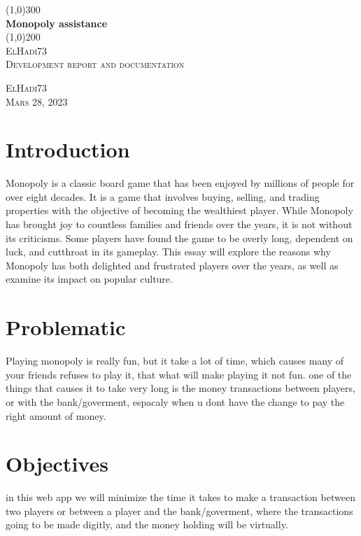 \documentclass{article}
\begin{document}
\begin{titlepage}
	\begin{center}
		\line(1,0){300}\\
		[0.25in]
		\huge{\bfseries Monopoly assistance}\\
		[2mm]
		\line(1,0){200}\\
		[1.5cm]
		\textsc{\LARGE ElHadi73}\\
		[0.75cm]
		\textsc{\Large Development report and documentation}\\
		[10cm]
	\end{center}
	\begin{flushright}
		\textsc{\large ElHadi73\\
		Mars 28, 2023\\}
	\end{flushright}
\end{titlepage}

\section{Introduction}\label{sec:intro}
Monopoly is a classic board game that has been enjoyed by millions of people for over eight decades. It is a game that involves buying, selling, and trading properties with the objective of becoming the wealthiest player. While Monopoly has brought joy to countless families and friends over the years, it is not without its criticisms. Some players have found the game to be overly long, dependent on luck, and cutthroat in its gameplay. This essay will explore the reasons why Monopoly has both delighted and frustrated players over the years, as well as examine its impact on popular culture.

\section{Problematic}\label{sec:prbm}
Playing monopoly is really fun, but it take a lot of time, which causes many of your friends refuses to play it, that what will make playing it not fun.
one of the things that causes it to take very long is the money transactions between players, or with the bank/goverment, espacaly when u dont have the change to pay the right amount of money.

\section{Objectives}\label{sec:obj}
in this web app we will minimize the time it takes to make a transaction between two players or between a player and the bank/goverment, where the transactions going to be made digitly, and the money holding will be virtually.
\end{document}
